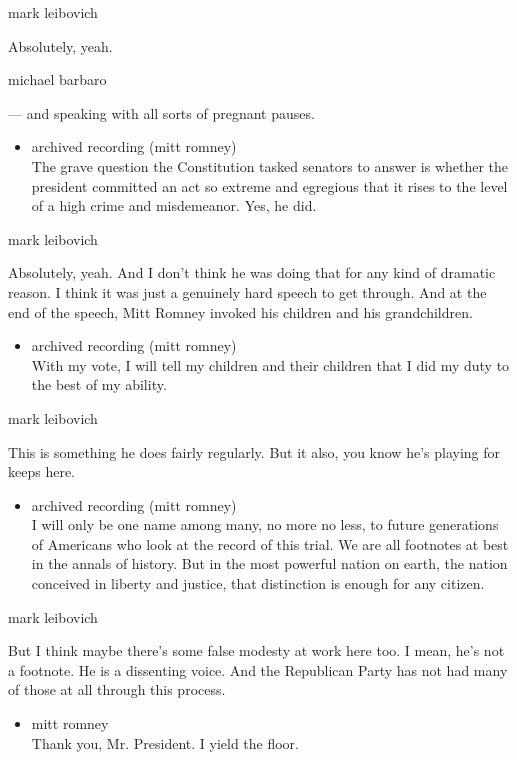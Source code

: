 mark leibovich

Absolutely, yeah.

michael barbaro

--- and speaking with all sorts of pregnant pauses.

\begin{itemize}
\tightlist
\item
  archived recording (mitt romney)\\
  The grave question the Constitution tasked senators to answer is
  whether the president committed an act so extreme and egregious that
  it rises to the level of a high crime and misdemeanor. Yes, he did.
\end{itemize}

mark leibovich

Absolutely, yeah. And I don't think he was doing that for any kind of
dramatic reason. I think it was just a genuinely hard speech to get
through. And at the end of the speech, Mitt Romney invoked his children
and his grandchildren.

\begin{itemize}
\tightlist
\item
  archived recording (mitt romney)\\
  With my vote, I will tell my children and their children that I did my
  duty to the best of my ability.
\end{itemize}

mark leibovich

This is something he does fairly regularly. But it also, you know he's
playing for keeps here.

\begin{itemize}
\tightlist
\item
  archived recording (mitt romney)\\
  I will only be one name among many, no more no less, to future
  generations of Americans who look at the record of this trial. We are
  all footnotes at best in the annals of history. But in the most
  powerful nation on earth, the nation conceived in liberty and justice,
  that distinction is enough for any citizen.
\end{itemize}

mark leibovich

But I think maybe there's some false modesty at work here too. I mean,
he's not a footnote. He is a dissenting voice. And the Republican Party
has not had many of those at all through this process.

\begin{itemize}
\tightlist
\item
  mitt romney\\
  Thank you, Mr. President. I yield the floor.
\end{itemize}

